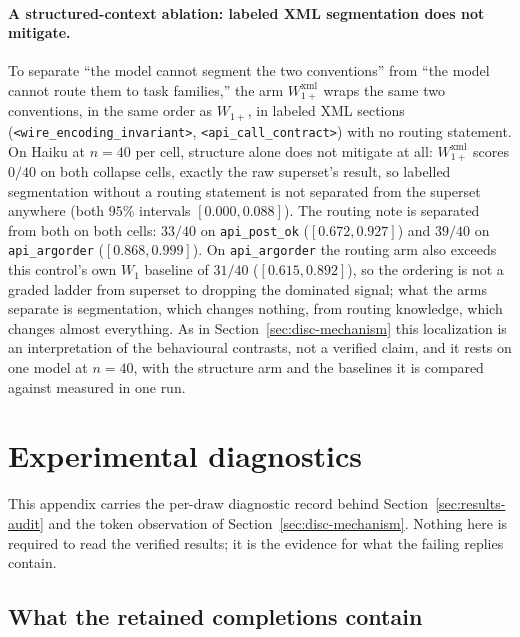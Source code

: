 \documentclass[11pt]{article}
\theoremstyle{plain}
\theoremstyle{definition}
\theoremstyle{remark}
\begin{document}
\paragraph{A structured-context ablation: labeled XML segmentation does not mitigate.}
To separate ``the model cannot segment the two conventions'' from ``the model cannot route them
to task families,'' the arm $W_{1+}^{\mathrm{xml}}$ wraps the same two conventions, in the same
order as $W_{1+}$, in labeled XML sections (\texttt{<wire\_encoding\_invariant>},
\texttt{<api\_call\_contract>}) with no routing statement. On Haiku at $n=40$ per
cell, structure alone does not mitigate at all:
$W_{1+}^{\mathrm{xml}}$ scores $0/40$ on both collapse cells, exactly the raw superset's result,
so labelled segmentation without a routing statement is not separated from the superset anywhere
(both $95\%$ intervals $[0.000,0.088]$). The routing note is separated from both on both cells:
$33/40$ on \texttt{api\_post\_ok} ($[0.672,0.927]$) and $39/40$ on \texttt{api\_argorder}
($[0.868,0.999]$). On \texttt{api\_argorder} the routing arm also exceeds this control's own
$W_1$ baseline of $31/40$ ($[0.615,0.892]$), so the ordering is not a graded ladder from
superset to dropping the dominated signal; what the arms separate is segmentation, which changes
nothing, from routing knowledge, which changes almost everything. As in
Section~\ref{sec:disc-mechanism} this localization is an
interpretation of the behavioural contrasts, not a verified claim, and it rests on one model at
$n=40$, with the structure arm and the baselines it is compared against measured in one run.


\section{Experimental diagnostics}
\label{app:diag}

This appendix carries the per-draw diagnostic record behind Section~\ref{sec:results-audit} and the
token observation of Section~\ref{sec:disc-mechanism}. Nothing here is required to read the verified
results; it is the evidence for what the failing replies contain.
\subsection{What the retained completions contain}
\label{app:audit}
\end{document}
